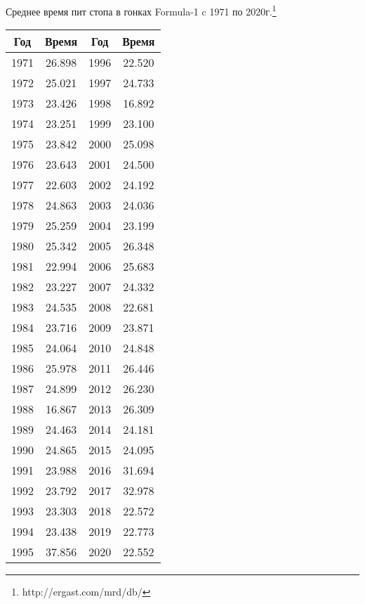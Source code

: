\documentclass[utf8, a4paper, 14pt, russian, oneside]{book}
\begin{document}


\tableofcontents
\newpage

Среднее время пит стопа в гонках Formula-1 c 1971 по 2020г.\footnote{http://ergast.com/mrd/db/}
\begin{table}[h!]
    \centering
    \begin{tabular}{|c|c|c|c|}
        \hline
        Год & Время & Год & Время \\ \hline
        1971 & 26.898 & 1996 & 22.520 \\ \hline
        1972 & 25.021 & 1997 & 24.733 \\ \hline
        1973 & 23.426 & 1998 & 16.892 \\ \hline
        1974 & 23.251 & 1999 & 23.100 \\ \hline
        1975 & 23.842 & 2000 & 25.098 \\ \hline
        1976 & 23.643 & 2001 & 24.500 \\ \hline
        1977 & 22.603 & 2002 & 24.192 \\ \hline
        1978 & 24.863 & 2003 & 24.036 \\ \hline
        1979 & 25.259 & 2004 & 23.199 \\ \hline
        1980 & 25.342 & 2005 & 26.348 \\ \hline
        1981 & 22.994 & 2006 & 25.683 \\ \hline
        1982 & 23.227 & 2007 & 24.332 \\ \hline
        1983 & 24.535 & 2008 & 22.681 \\ \hline
        1984 & 23.716 & 2009 & 23.871 \\ \hline
        1985 & 24.064 & 2010 & 24.848 \\ \hline
        1986 & 25.978 & 2011 & 26.446 \\ \hline
        1987 & 24.899 & 2012 & 26.230 \\ \hline
        1988 & 16.867 & 2013 & 26.309 \\ \hline
        1989 & 24.463 & 2014 & 24.181 \\ \hline
        1990 & 24.865 & 2015 & 24.095 \\ \hline
        1991 & 23.988 & 2016 & 31.694 \\ \hline
        1992 & 23.792 & 2017 & 32.978 \\ \hline
        1993 & 23.303 & 2018 & 22.572 \\ \hline
        1994 & 23.438 & 2019 & 22.773 \\ \hline
        1995 & 37.856 & 2020 & 22.552 \\ \hline
    \end{tabular}
\end{table}
\newpage

\end{document}

